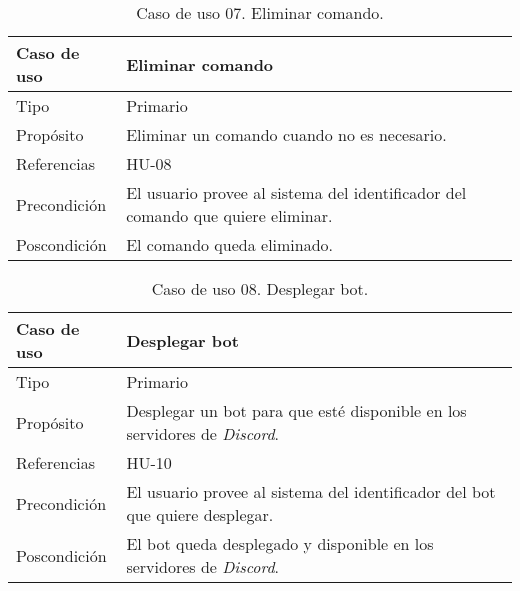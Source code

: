 \begin{table}[H]
    \centering
    \def\arraystretch{1.25}
    \begin{adjustbox}{max width=\textwidth}
    \begin{tabularx}{\textwidth}{l|L}
    \hline
        \textbf{Caso de uso} & \textbf{Eliminar comando} \\ \hline
    \hline
        Tipo & Primario \\ \hline
        Propósito & Eliminar un comando cuando no es necesario. \\ \hline
        Referencias & HU-08 \\ \hline
        Precondición & El usuario provee al sistema del identificador del comando que quiere eliminar. \\ \hline
        Poscondición & El comando queda eliminado. \\ \hline
    \end{tabularx}
    \end{adjustbox}
    \caption{Caso de uso 07. Eliminar comando.}
\end{table}

\begin{table}[H]
    \centering
    \def\arraystretch{1.25}
    \begin{adjustbox}{max width=\textwidth}
    \begin{tabularx}{\textwidth}{l|L}
    \hline
        \textbf{Caso de uso} & \textbf{Desplegar bot} \\ \hline
    \hline
        Tipo & Primario \\ \hline
        Propósito & Desplegar un bot para que esté disponible en los servidores de \textit{Discord}. \\ \hline
        Referencias & HU-10 \\ \hline
        Precondición & El usuario provee al sistema del identificador del bot que quiere desplegar. \\ \hline
        Poscondición & El bot queda desplegado y disponible en los servidores de \textit{Discord}. \\ \hline
    \end{tabularx}
    \end{adjustbox}
    \caption{Caso de uso 08. Desplegar bot.}
\end{table}

